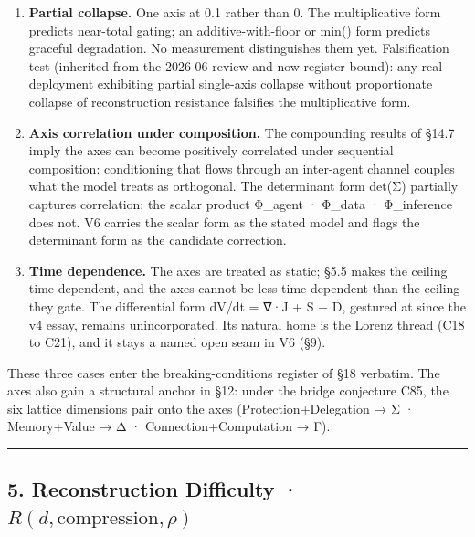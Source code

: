 \documentclass[
  11pt,
]{article}
\providecommand{\tightlist}{%
  \setlength{\itemsep}{0pt}\setlength{\parskip}{0pt}}
\begin{document}
\begin{enumerate}
\def\labelenumi{\arabic{enumi}.}
\tightlist
\item
  \textbf{Partial collapse.} One axis at 0.1 rather than 0. The
  multiplicative form predicts near-total gating; an additive-with-floor
  or min() form predicts graceful degradation. No measurement
  distinguishes them yet. Falsification test (inherited from the 2026-06
  review and now register-bound): any real deployment exhibiting partial
  single-axis collapse without proportionate collapse of reconstruction
  resistance falsifies the multiplicative form.
\item
  \textbf{Axis correlation under composition.} The compounding results
  of §14.7 imply the axes can become positively correlated under
  sequential composition: conditioning that flows through an inter-agent
  channel couples what the model treats as orthogonal. The determinant
  form det(Σ) partially captures correlation; the scalar product
  Φ\_agent · Φ\_data · Φ\_inference does not. V6 carries the scalar form
  as the stated model and flags the determinant form as the candidate
  correction.
\item
  \textbf{Time dependence.} The axes are treated as static; §5.5 makes
  the ceiling time-dependent, and the axes cannot be less time-dependent
  than the ceiling they gate. The differential form dV/dt = ∇·J + S − D,
  gestured at since the v4 essay, remains unincorporated. Its natural
  home is the Lorenz thread (C18 to C21), and it stays a named open seam
  in V6 (§9).
\end{enumerate}

These three cases enter the breaking-conditions register of §18
verbatim. The axes also gain a structural anchor in §12: under the
bridge conjecture C85, the six lattice dimensions pair onto the axes
(Protection+Delegation → Σ · Memory+Value → Δ · Connection+Computation →
Γ).

\begin{center}\rule{0.5\linewidth}{0.5pt}\end{center}

\subsection{\texorpdfstring{5. Reconstruction Difficulty ·
\(R(d, \text{compression}, \rho)\)}{5. Reconstruction Difficulty · R(d, \textbackslash text\{compression\}, \textbackslash rho)}}\label{reconstruction-difficulty-rd-textcompression-rho}
\end{document}
